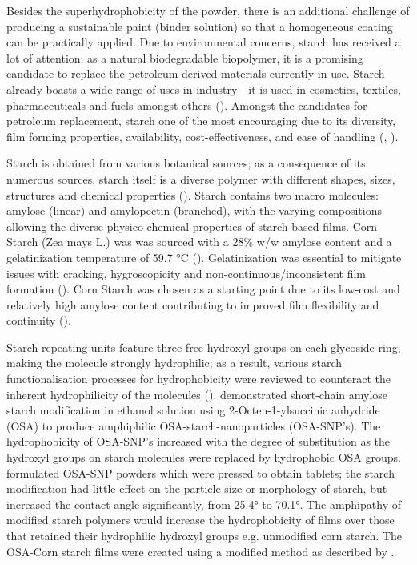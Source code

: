 Besides the superhydrophobicity of the powder,  there is an additional challenge of producing a sustainable paint (binder solution) so that a homogeneous coating can be practically applied. Due to environmental concerns, starch has received a lot of attention; as a natural biodegradable biopolymer, it is a promising candidate to replace the petroleum-derived materials currently in use. Starch already boasts a wide range of uses in industry - it is used in cosmetics, textiles, pharmaceuticals and fuels amongst others (\cite{kaur_ariffin_bhat_karim_2012}).  Amongst the candidates for petroleum replacement, starch one of the most encouraging due to its diversity, film forming properties, availability, cost-effectiveness, and ease of handling (\cite{dufresne_castaño_2016}, \cite{CAO2008119}).  
\par Starch is obtained from various botanical sources; as a consequence of its numerous sources, starch itself is a diverse polymer with different shapes, sizes, structures and chemical properties (\cite{smith_2001}). Starch contains two macro molecules: amylose (linear) and amylopectin (branched), with the varying compositions allowing the diverse physico-chemical properties of starch-based films. Corn Starch (Zea mays L.) was was sourced with a 28\% w/w amylose content  and a gelatinization temperature of 59.7 °C (\cite{luchese_spada_tessaro_2017}). Gelatinization was essential to mitigate issues with cracking, hygroscopicity and non-continuous/inconsistent film formation (\cite{ZOBEL1984285}). Corn Starch was chosen as a starting point due to its low-cost and relatively high amylose content contributing to improved film flexibility and continuity (\cite{Amylosebenefit}).
\par Starch repeating units feature three free hydroxyl groups on each glycoside ring, making the molecule strongly hydrophilic; as a result, various starch functionalisation processes for hydrophobicity were reviewed to counteract the inherent hydrophilicity of the molecules (\cite{wang}). \cite{jiang_dai_qin_xiong_sun_2016} demonstrated short-chain amylose starch modification in ethanol solution using 2-Octen-1-ylsuccinic anhydride (OSA) to produce amphiphilic OSA-starch-nanoparticles (OSA-SNP’s). The hydrophobicity of OSA-SNP’s increased with the degree of substitution as the hydroxyl groups on starch molecules were replaced by hydrophobic OSA groups. \cite{yu_jiang_zheng_cao_hou_xu_wang_jiang_pan_2019} formulated OSA-SNP powders which were pressed to obtain tablets; the starch modification had little effect on the particle size or morphology of starch, but increased the contact angle significantly, from 25.4° to 70.1°. The amphipathy of modified starch polymers would increase the hydrophobicity of films over those that retained their hydrophilic hydroxyl groups e.g.  unmodified corn starch. The OSA-Corn starch films were created using a modified method as described by \cite{OMSProcess}. 
